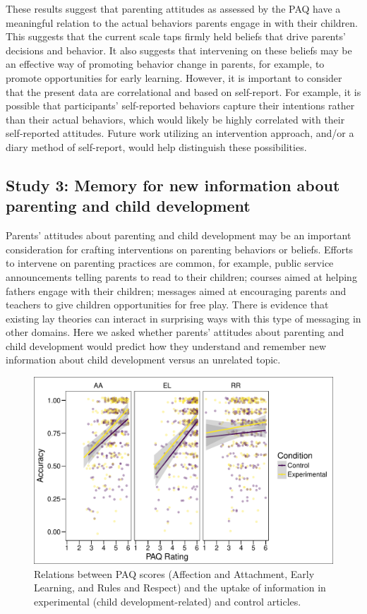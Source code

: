 \documentclass[floatsintext,man]{apa6}
\theoremstyle{definition}
\theoremstyle{definition}
\theoremstyle{definition}
\theoremstyle{remark}
\begin{document}
These results suggest that parenting attitudes as assessed by the PAQ
have a meaningful relation to the actual behaviors parents engage in
with their children. This suggests that the current scale taps firmly
held beliefs that drive parents' decisions and behavior. It also
suggests that intervening on these beliefs may be an effective way of
promoting behavior change in parents, for example, to promote
opportunities for early learning. However, it is important to consider
that the present data are correlational and based on self-report. For
example, it is possible that participants' self-reported behaviors
capture their intentions rather than their actual behaviors, which would
likely be highly correlated with their self-reported attitudes. Future
work utilizing an intervention approach, and/or a diary method of
self-report, would help distinguish these possibilities.

\subsection{Study 3: Memory for new information about parenting and
child
development}\label{study-3-memory-for-new-information-about-parenting-and-child-development}

Parents' attitudes about parenting and child development may be an
important consideration for crafting interventions on parenting
behaviors or beliefs. Efforts to intervene on parenting practices are
common, for example, public service announcements telling parents to
read to their children; courses aimed at helping fathers engage with
their children; messages aimed at encouraging parents and teachers to
give children opportunities for free play. There is evidence that
existing lay theories can interact in surprising ways with this type of
messaging in other domains. Here we asked whether parents' attitudes
about parenting and child development would predict how they understand
and remember new information about child development versus an unrelated
topic.

\begin{figure}
\centering
\includegraphics{PAQ_paper_files/figure-latex/uptake-1.pdf}
\caption{\label{fig:uptake}Relations between PAQ scores (Affection and
Attachment, Early Learning, and Rules and Respect) and the uptake of
information in experimental (child development-related) and control
articles.}
\end{figure}
\end{document}
